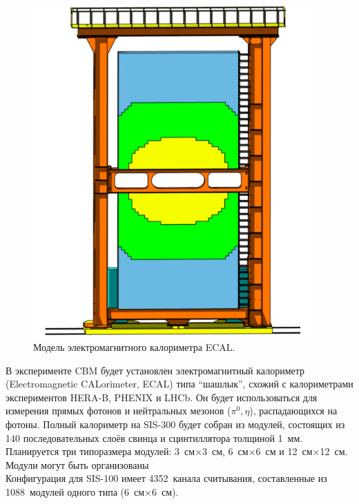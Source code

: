 \begin{minipage}[t]{0.495\textwidth}
\begin{figure}[H]
\includegraphics[width=0.95\textwidth]{pictures/CBM_ECAL_model.png}
\caption{Модель электромагнитного калориметра ECAL.}
\label{fig:ECAL}
\end{figure}
\end{minipage}
\begin{minipage}[t]{0.495\textwidth}
В эксперименте CBM будет установлен электромагнитный калориметр (Electromagnetic CALorimeter, ECAL) типа ``шашлык'', схожий с калориметрами экспериментов HERA-B, PHENIX и LHCb. Он будет использоваться для измерения прямых фотонов и нейтральных мезонов ($ \pi^{0}, \eta $), распадающихся на фотоны. Полный калориметр на SIS-300 будет собран из модулей, состоящих из 140 последовательных слоёв свинца и сцинтиллятора толщиной 1~мм. Планируется три типоразмера модулей: 3~см$\times$3~см, 6~см$\times$6~см и 12~см$\times$12~см. Модули могут быть организованы \\
Конфигурация для SIS-100 имеет 4352~канала считывания, составленные из 1088~модулей одного типа (6~см$\times$6~см). 
\end{minipage}


